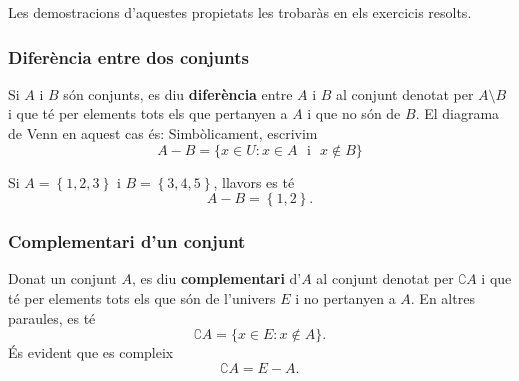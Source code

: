 Les demostracions d'aquestes propietats les trobar\`{a}s en els exercicis
resolts.

\subsubsection{Difer\`{e}ncia entre dos conjunts}

Si $A$ i $B$ s\'{o}n conjunts, es diu \textbf{difer\`{e}ncia} entre $A$ i $B$
al conjunt denotat per $A\setminus B$ i que t\'{e} per elements tots els que
pertanyen a $A$ i que no s\'{o}n de $B$. El diagrama de Venn en aquest cas
\'{e}s: Simb\`{o}licament,
escrivim%
\begin{equation*}
A-B=\{x\in U:x\in A\text{ ~i~ }x\notin B\}
\end{equation*}

\begin{exem}
Si $A=\left\{ 1,2,3\right\} $ i $B=\left\{ 3,4,5\right\} $, llavors es t\'{e}%
\begin{equation*}
A-B=\left\{ 1,2\right\} \text{.}
\end{equation*}
\end{exem}

\subsubsection{Complementari d'un conjunt}

Donat un conjunt $A$, es diu \textbf{complementari} d'$A$ al conjunt denotat
per $\complement A$ i que t\'{e} per elements tots els que s\'{o}n de
l'univers $E$ i no pertanyen a $A$.
En altres paraules, es t\'{e}%
\begin{equation*}
\complement A=\{x\in E:x\notin A\}\text{.}
\end{equation*}
\'{E}s evident que es compleix%
\begin{equation*}
\complement A=E-A\text{.}
\end{equation*}

